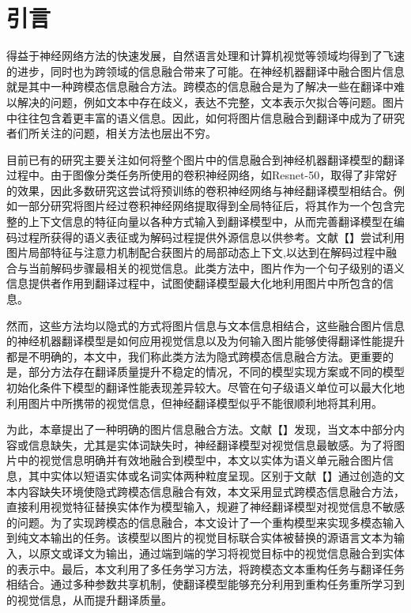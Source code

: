 \section{引言}

得益于神经网络方法的快速发展，自然语言处理和计算机视觉等领域均得到了飞速的进步，同时也为跨领域的信息融合带来了可能。在神经机器翻译中融合图片信息就是其中一种跨模态信息融合方法。跨模态的信息融合是为了解决一些在翻译中难以解决的问题，例如文本中存在歧义，表达不完整，文本表示欠拟合等问题。图片中往往包含着更丰富的语义信息。因此，如何将图片信息融合到翻译中成为了研究者们所关注的问题，相关方法也层出不穷。

目前已有的研究主要关注如何将整个图片中的信息融合到神经机器翻译模型的翻译过程中。由于图像分类任务所使用的卷积神经网络，如Resnet-50，取得了非常好的效果，因此多数研究这尝试将预训练的卷积神经网络与神经翻译模型相结合。例如一部分研究将图片经过卷积神经网络提取得到全局特征后，将其作为一个包含完整的上下文信息的特征向量以各种方式输入到翻译模型中，从而完善翻译模型在编码过程所获得的语义表征或为解码过程提供外源信息以供参考。文献【】尝试利用图片局部特征与注意力机制配合获图片的局部动态上下文,以达到在解码过程中融合与当前解码步骤最相关的视觉信息。此类方法中，图片作为一个句子级别的语义信息提供者作用到翻译过程中，试图使翻译模型最大化地利用图片中所包含的信息。

然而，这些方法均以隐式的方式将图片信息与文本信息相结合，这些融合图片信息的神经机器翻译模型是如何应用视觉信息以及为何输入图片能够使得翻译性能提升都是不明确的，本文中，我们称此类方法为隐式跨模态信息融合方法。更重要的是，部分方法存在翻译质量提升不稳定的情况，不同的模型实现方案或不同的模型初始化条件下模型的翻译性能表现差异较大。尽管在句子级语义单位可以最大化地利用图片中所携带的视觉信息，但神经翻译模型似乎不能很顺利地将其利用。

为此，本章提出了一种明确的图片信息融合方法。文献【】发现，当文本中部分内容或信息缺失，尤其是实体词缺失时，神经翻译模型对视觉信息最敏感。为了将图片中的视觉信息明确并有效地融合到模型中，本文以实体为语义单元融合图片信息，其中实体以短语实体或名词实体两种粒度呈现。区别于文献【】通过创造的文本内容缺失环境使隐式跨模态信息融合有效，本文采用显式跨模态信息融合方法，直接利用视觉特征替换实体作为模型输入，规避了神经翻译模型对视觉信息不敏感的问题。为了实现跨模态的信息融合，本文设计了一个重构模型来实现多模态输入到纯文本输出的任务。该模型以图片的视觉目标联合实体被替换的源语言文本为输入，以原文或译文为输出，通过端到端的学习将视觉目标中的视觉信息融合到实体的表示中。最后，本文利用了多任务学习方法，将跨模态文本重构任务与翻译任务相结合。通过多种参数共享机制，使翻译模型能够充分利用到重构任务重所学习到的视觉信息，从而提升翻译质量。

